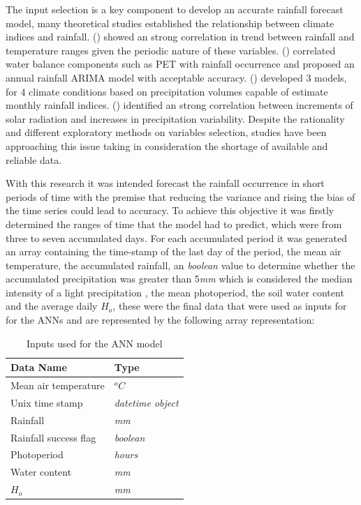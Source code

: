 The input selection is a key component to develop an accurate rainfall forecast model, many theoretical studies established the relationship between climate indices and rainfall.\citeauthor{tularam2010time} (\citeyear{tularam2010time}) showed an strong correlation in trend between rainfall and temperature ranges given the periodic nature of these variables.  \citeauthor{feng2016trend} (\citeyear{feng2016trend}) correlated water balance components such as PET with rainfall occurrence and proposed an annual rainfall ARIMA model with acceptable accuracy. \citeauthor{valipour2016much} (\citeyear{valipour2016much}) developed 3 models, for 4 climate conditions based on precipitation volumes capable of estimate monthly rainfall indices. \citeauthor{medvigy2012trends} (\citeyear{medvigy2012trends}) identified an strong correlation between increments of solar radiation and increases in precipitation variability. Despite the rationality and different exploratory methods on variables selection, studies have been approaching this issue taking in consideration the shortage of available and reliable data.

With this research it was intended forecast the rainfall occurrence in short periods of time with the premise that reducing the variance and rising the bias of the time series could lead to accuracy. To achieve this objective it was firstly determined the ranges of time that the model had to predict, which were from three to seven accumulated days. For each accumulated period it was generated an array containing the time-stamp of the last day of the period, the mean air temperature, the accumulated rainfall, an \textit{boolean} value to determine whether the accumulated precipitation was greater than 5\textit {mm} which is considered the median intensity of a light precipitation \cite{sun2006often}, the mean photoperiod, the soil water content and the average daily $H_o$, these were the final data that were used as inputs for for the ANNs and are represented by the following array representation:

\begin{table}[h]
 \caption{Inputs used for the ANN model}
\label{tab:netinputs}
\begin{center}
\begin{tabular}{ll}\hline
Data Name & Type\\\hline
Mean air temperature & $^oC$\\
Unix time stamp & \textit{datetime object}\\
Rainfall & \textit{mm}\\
Rainfall success flag & \textit{boolean}\\
Photoperiod & \textit{hours}\\
Water content & \textit{mm}\\
$H_o$ & \textit{mm}\\
\hline
\end{tabular}
\end{center}
\end{table}

